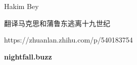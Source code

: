 \documentclass[DIV=12,%
               BCOR=0mm,%
               headinclude=false,%
               footinclude=false,open=any,%
               fontsize=10pt,%
               oneside,%
               paper=210mm:11in]%
               {scrbook}
\newcommand*{\Slash}{\slash\hspace{0pt}}
\begin{document}
\strut

\vfill

\begin{center}


Hakim Bey

翻译\textbar{}马克思和蒲鲁东逃离十九世纪






\bigskip


https:\Slash{}\Slash{}zhuanlan.zhihu.com\Slash{}p\Slash{}540183754
   

       

       

       

       

       

       

   



\bigskip
\textbf{nightfall.buzz}


\end{center}



\end{document}
